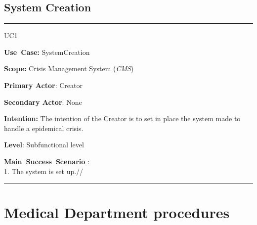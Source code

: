 \subsection{System Creation}
\vspace{0.5cm}
\hrule
\vspace{0.5cm}
\begin{lyxlist}{UC1}
\small{
\item [\textbf{Use~Case:}] SystemCreation
\item [\textbf{Scope:}] Crisis Management System (\emph{CMS})
\item [\textbf{Primary Actor}:] Creator
\item [\textbf{Secondary Actor}:] None
\item [\textbf{Intention:}] The intention of the Creator is to set in place the system made to handle a epidemical crisis. 
\item [\textbf{Level}:]Subfunctional level
\item [\textbf{Main~Success~Scenario}]:\\
1. The system is set up.// }
\end{lyxlist}
\hrule 
\vspace{0.5cm} 

\section{Medical Department procedures}

